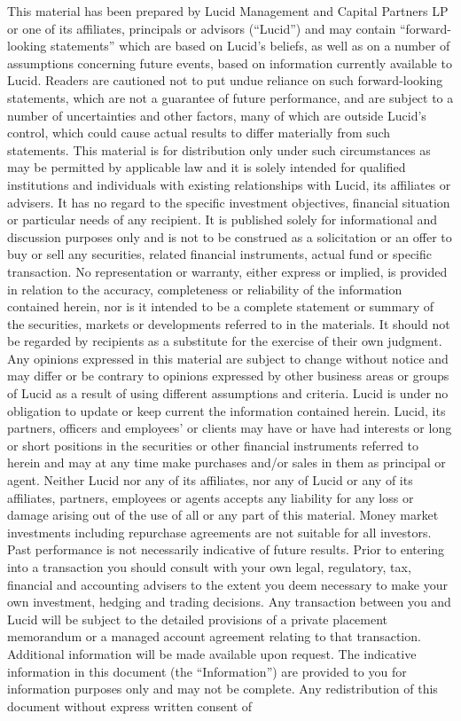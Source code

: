 \documentclass[9pt]{article}
\begin{document}
\scriptsize

\noindent This material has been prepared by Lucid Management and Capital Partners LP or one of its affiliates, principals or advisors (``Lucid'') and may contain ``forward-looking statements'' which are based on Lucid's beliefs, as well as on a number of assumptions concerning future events, based on information currently available to Lucid. Readers are cautioned not to put undue reliance on such forward-looking statements, which are not a guarantee of future performance, and are subject to a number of uncertainties and other factors, many of which are outside Lucid's control, which could cause actual results to differ materially from such statements. This material is for distribution only under such circumstances as may be permitted by applicable law and it is solely intended for qualified institutions and individuals with existing relationships with Lucid, its affiliates or advisers.  It has no regard to the specific investment objectives, financial situation or particular needs of any recipient. It is published solely for informational and discussion purposes only and is not to be construed as a solicitation or an offer to buy or sell any securities, related financial instruments, actual fund or specific transaction. No representation or warranty, either express or implied, is provided in relation to the accuracy, completeness or reliability of the information contained herein, nor is it intended to be a complete statement or summary of the securities, markets or developments referred to in the materials.  It should not be regarded by recipients as a substitute for the exercise of their own judgment. Any opinions expressed in this material are subject to change without notice and may differ or be contrary to opinions expressed by other business areas or groups of Lucid as a result of using different assumptions and criteria. Lucid is under no obligation to update or keep current the information contained herein. Lucid, its partners, officers and employees' or clients may have or have had interests or long or short positions in the securities or other financial instruments referred to herein and may at any time make purchases and/or sales in them as principal or agent. Neither Lucid nor any of its affiliates, nor any of Lucid or any of its affiliates, partners, employees or agents accepts any liability for any loss or damage arising out of the use of all or any part of this material. Money market investments including repurchase agreements are not suitable for all investors. Past performance is not necessarily indicative of future results.  Prior to entering into a transaction you should consult with your own legal, regulatory, tax, financial and accounting advisers to the extent you deem necessary to make your own investment, hedging and trading decisions. Any transaction between you and Lucid will be subject to the detailed provisions of a private placement memorandum or a managed account agreement relating to that transaction. Additional information will be made available upon request. The indicative information in this document (the ``Information'') are provided to you for information purposes only and may not be complete. Any redistribution of this document without express written consent of 
\end{document}
